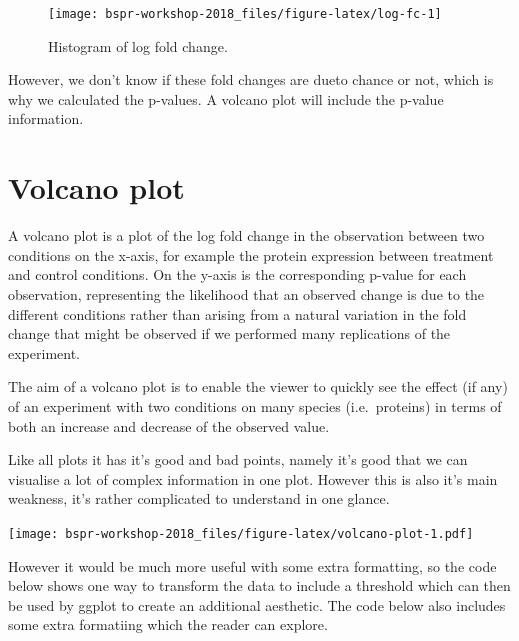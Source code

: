 \documentclass[12pt,]{book}
\newenvironment{Shaded}{\begin{snugshade}}{\end{snugshade}}
\newcommand{\KeywordTok}[1]{\textcolor[rgb]{0.13,0.29,0.53}{\textbf{#1}}}
\newcommand{\NormalTok}[1]{#1}
\newcommand{\OperatorTok}[1]{\textcolor[rgb]{0.81,0.36,0.00}{\textbf{#1}}}
\newcommand{\StringTok}[1]{\textcolor[rgb]{0.31,0.60,0.02}{#1}}
\begin{document}
\begin{figure}

{\centering \texttt{[image: bspr-workshop-2018\_files/figure-latex/log-fc-1]} 

}

\caption{Histogram of log fold change.}\label{fig:log-fc}
\end{figure}

However, we don't know if these fold changes are dueto chance or not, which is
why we calculated the p-values. A volcano plot will include the p-value
information.

\hypertarget{volcano-plot}{%
\section{Volcano plot}\label{volcano-plot}}

A volcano plot is a plot of the log fold change in the observation between two
conditions on the x-axis, for example the protein expression between treatment
and control conditions. On the y-axis is the corresponding p-value for each
observation, representing the likelihood that an observed change
is due to the different conditions rather than arising from a natural variation
in the fold change that might be observed if we performed many replications of
the experiment.

The aim of a volcano plot is to enable the viewer to quickly see the effect
(if any) of an experiment with two conditions on many species (i.e.~proteins)
in terms of both an increase and decrease of the observed value.

Like all plots it has it's good and bad points, namely it's good that we can
visualise a lot of complex information in one plot. However this is also it's
main weakness, it's rather complicated to understand in one glance.

\begin{Shaded}
\end{Shaded}

\texttt{[image: bspr-workshop-2018\_files/figure-latex/volcano-plot-1.pdf]}

However it would be much more useful with some extra formatting, so the code
below shows one way to transform the data to include a threshold which can
then be used by ggplot to create an additional aesthetic. The code below
also includes some extra formatiing which the reader can explore.
\end{document}
